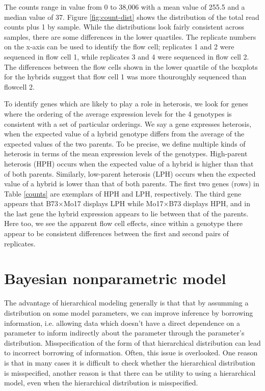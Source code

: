 The counts range in value from 0 to 38,006 with a mean value of 255.5 and a median value of 37. Figure \ref{fig:count-dist} shows the distribution of the total read counts plus 1 by sample. While the distributions look fairly consistent across samples, there are some differences in the lower quartiles. The replicate numbers on the x-axis can be used to identify the flow cell; replicates 1 and 2 were sequenced in flow cell 1, while replicates 3 and 4 were sequenced in flow cell 2. The differences between the flow cells shown in the lower quartile of the boxplots for the hybrids suggest that flow cell 1 was more thouroughly sequenced than flowcell 2.


To identify genes which are likely to play a role in heterosis, we look for genes where the ordering of the average expression levels for the 4 genotypes is consistent with a set of particular orderings. We say a gene expresses heterosis, when the expected value of a hybrid genotype differs from the average of the expected values of the two parents. To be precise, we define multiple kinds of heterosis in terms of the mean expression levels of the genotypes. High-parent heterosis (HPH) occurs when the expected value of a hybrid is higher than that of both parents. Similarly, low-parent heterosis (LPH) occurs when the expected value of a hybrid is lower than that of both parents. The first two genes (rows) in Table \ref{counts} are exemplars of HPH and LPH, respectively. The third gene appears that B73$\times$Mo17 displays LPH while Mo17$\times$B73 displays HPH, and in the last gene the hybrid expression appears to lie between that of the parents. Here too, we see the apparent flow cell effects, since within a genotype there appear to be consistent differences between the first and second pairs of replicates.

\section{Bayesian nonparametric model}
The advantage of hierarchical modeling generally is that that by assumming a distribution on some model parameters, we can improve inference by borrowing information, i.e. allowing data which doesn't have a direct dependence on a parameter to inform indirectly about the parameter through the parameter's distribution. Misspecification of the form of that hierarchical distribution can lead to incorrect borrowing of information. Often, this issue is overlooked. One reason is that in many cases it is difficult to check whether the hierarchical distribution is misspecified, another reason is that there can be utility to using a hierarchical model, even when the hierarchical distribution is misspecified.

